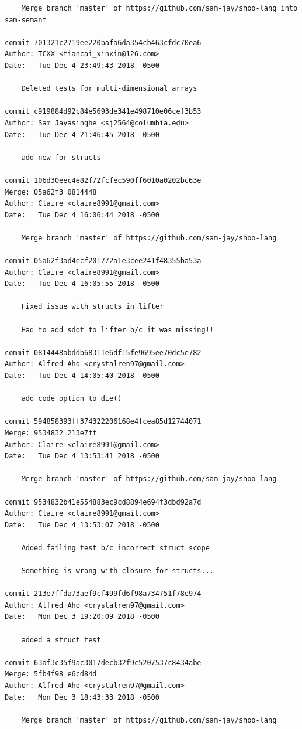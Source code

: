 \documentclass[12pt]{article}
\begin{document}
\begin{lstlisting}
    Merge branch 'master' of https://github.com/sam-jay/shoo-lang into sam-semant

commit 701321c2719ee220bafa6da354cb463cfdc70ea6
Author: TCXX <tiancai_xinxin@126.com>
Date:   Tue Dec 4 23:49:43 2018 -0500

    Deleted tests for multi-dimensional arrays

commit c919884d92c84e5693de341e498710e06cef3b53
Author: Sam Jayasinghe <sj2564@columbia.edu>
Date:   Tue Dec 4 21:46:45 2018 -0500

    add new for structs

commit 106d30eec4e82f72fcfec590ff6010a0202bc63e
Merge: 05a62f3 0814448
Author: Claire <claire8991@gmail.com>
Date:   Tue Dec 4 16:06:44 2018 -0500

    Merge branch 'master' of https://github.com/sam-jay/shoo-lang

commit 05a62f3ad4ecf201772a1e3cee241f48355ba53a
Author: Claire <claire8991@gmail.com>
Date:   Tue Dec 4 16:05:55 2018 -0500

    Fixed issue with structs in lifter
    
    Had to add sdot to lifter b/c it was missing!!

commit 0814448abddb68311e6df15fe9695ee70dc5e782
Author: Alfred Aho <crystalren97@gmail.com>
Date:   Tue Dec 4 14:05:40 2018 -0500

    add code option to die()

commit 594858393ff374322206168e4fcea85d12744071
Merge: 9534832 213e7ff
Author: Claire <claire8991@gmail.com>
Date:   Tue Dec 4 13:53:41 2018 -0500

    Merge branch 'master' of https://github.com/sam-jay/shoo-lang

commit 9534832b41e554883ec9cd8894e694f3dbd92a7d
Author: Claire <claire8991@gmail.com>
Date:   Tue Dec 4 13:53:07 2018 -0500

    Added failing test b/c incorrect struct scope
    
    Something is wrong with closure for structs...

commit 213e7ffda73aef9cf499fd6f98a734751f78e974
Author: Alfred Aho <crystalren97@gmail.com>
Date:   Mon Dec 3 19:20:09 2018 -0500

    added a struct test

commit 63af3c35f9ac3017decb32f9c5207537c8434abe
Merge: 5fb4f98 e6cd84d
Author: Alfred Aho <crystalren97@gmail.com>
Date:   Mon Dec 3 18:43:33 2018 -0500

    Merge branch 'master' of https://github.com/sam-jay/shoo-lang


\end{lstlisting}
\end{document}
